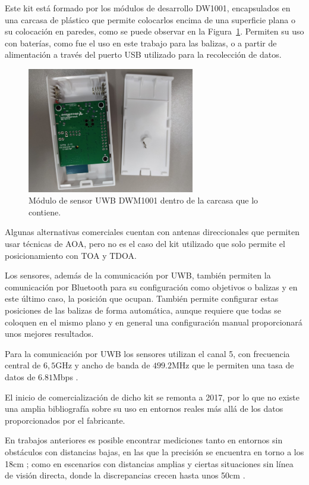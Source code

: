 Este kit está formado por los módulos de desarrollo DW1001, encapsulados en una carcasa de plástico que permite colocarlos encima de una superficie plana o su colocación en paredes, como se puede observar en la Figura~\ref{fig:sensor_UWB}.
Permiten su uso con baterías, como fue el uso en este trabajo para las balizas, o a partir de alimentación a través del puerto USB utilizado para la recolección de datos.

\begin{figure}[H]
    \centering
    \includegraphics[width=0.65\textwidth]{pic/sensor_abierto.jpg}
    \caption{Módulo de sensor UWB DWM1001 dentro de la carcasa que lo contiene.}
    \label{fig:sensor_UWB}
\end{figure}

Algunas alternativas comerciales cuentan con antenas direccionales que permiten usar técnicas de AOA, pero no es el caso del kit utilizado que solo permite el posicionamiento con TOA y TDOA.

Los sensores, además de la comunicación por UWB, también permiten la comunicación por Bluetooth para su configuración como objetivos o balizas y en este último caso, la posición que ocupan.
También permite configurar estas posiciones de las balizas de forma automática, aunque requiere que todas se coloquen en el mismo plano y en general una configuración manual proporcionará unos mejores resultados.

Para la comunicación por UWB los sensores utilizan el canal 5, con frecuencia central de $6,5$GHz y ancho de banda de $499.2$MHz que le permiten una tasa de datos de $6.81$Mbps \cite{Decawave}.

El inicio de comercialización de dicho kit se remonta a 2017, por lo que no existe una amplia bibliografía sobre su uso en entornos reales más allá de los datos proporcionados por el fabricante.

En trabajos anteriores es posible encontrar mediciones tanto en entornos sin obstáculos con distancias bajas, en las que la precisión se encuentra en torno a los 18cm \cite{Simedroni}; como en escenarios con distancias amplias y ciertas situaciones sin línea de visión directa, donde la discrepancias crecen hasta unos 50cm \cite{jimenez, kulmer}.

